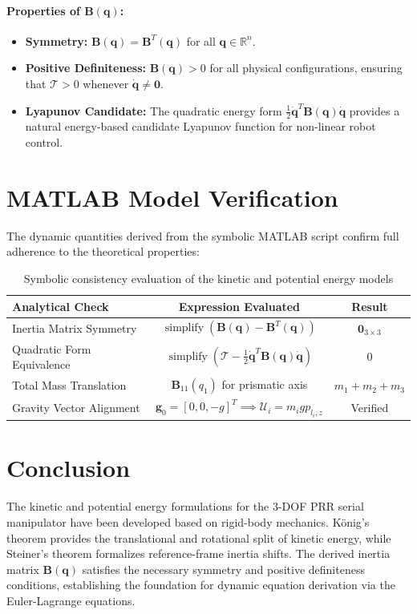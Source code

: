 \documentclass[11pt, a4paper]{article}
\begin{document}
\paragraph{Properties of $\mathbf{B}(\mathbf{q})$:}
\begin{itemize}
    \item \textbf{Symmetry:} $\mathbf{B}(\mathbf{q}) = \mathbf{B}^T(\mathbf{q})$ for all $\mathbf{q} \in \mathbb{R}^n$.
    \item \textbf{Positive Definiteness:} $\mathbf{B}(\mathbf{q}) > 0$ for all physical configurations, ensuring that $\mathcal{T} > 0$ whenever $\mathbf{\dot{q}} \neq \mathbf{0}$.
    \item \textbf{Lyapunov Candidate:} The quadratic energy form $\frac{1}{2}\mathbf{\dot{q}}^T\mathbf{B}(\mathbf{q})\mathbf{\dot{q}}$ provides a natural energy-based candidate Lyapunov function for non-linear robot control.
\end{itemize}

\section{MATLAB Model Verification}
The dynamic quantities derived from the symbolic MATLAB script confirm full adherence to the theoretical properties:

\begin{table}[htbp]
\centering
\caption{Symbolic consistency evaluation of the kinetic and potential energy models}
\label{tab:matlab_checks}
\begin{tabular}{lcc}
\toprule
\textbf{Analytical Check} & \textbf{Expression Evaluated} & \textbf{Result} \\
\midrule
Inertia Matrix Symmetry & $\operatorname{simplify}(\mathbf{B}(\mathbf{q}) - \mathbf{B}^T(\mathbf{q}))$ & $\mathbf{0}_{3\times 3}$ \\
Quadratic Form Equivalence & $\operatorname{simplify}\left(\mathcal{T} - \frac{1}{2}\mathbf{\dot{q}}^T\mathbf{B}(\mathbf{q})\mathbf{\dot{q}}\right)$ & $0$ \\
Total Mass Translation & $\mathbf{B}_{11}(q_1)$ for prismatic axis & $m_1 + m_2 + m_3$ \\
Gravity Vector Alignment & $\mathbf{g}_0 = [0, 0, -g]^T \implies \mathcal{U}_i = m_i g p_{l_{i},z}$ & Verified \\
\bottomrule
\end{tabular}
\end{table}

\section{Conclusion}
The kinetic and potential energy formulations for the 3-DOF PRR serial manipulator have been developed based on rigid-body mechanics. König's theorem provides the translational and rotational split of kinetic energy, while Steiner's theorem formalizes reference-frame inertia shifts. The derived inertia matrix $\mathbf{B}(\mathbf{q})$ satisfies the necessary symmetry and positive definiteness conditions, establishing the foundation for dynamic equation derivation via the Euler-Lagrange equations.
\end{document}
